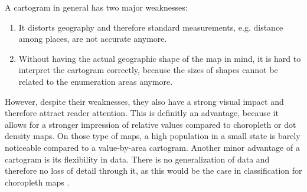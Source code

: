 A cartogram in general has two major weaknesses:
\begin{enumerate}
\item It distorts geography and therefore standard measurements, e.g. distance among places, are not accurate anymore.
\item Without having the actual geographic shape of the map in mind, it is hard to interpret the cartogram correctly, because the sizes of shapes cannot be related to the enumeration areas anymore.
\end{enumerate}

However, despite their weaknesses, they also have a strong visual impact and therefore attract reader attention. This is definitly an advantage, because it allows for a stronger impression of relative values compared to choropleth or dot density maps. On those type of maps, a high population in a small state is barely noticeable compared to a value-by-area cartogram.
Another minor advantage of a cartogram is its flexibility in data. There is no generalization of data and therefore no loss of detail through it, as this would be the case in classification for choropleth maps .
